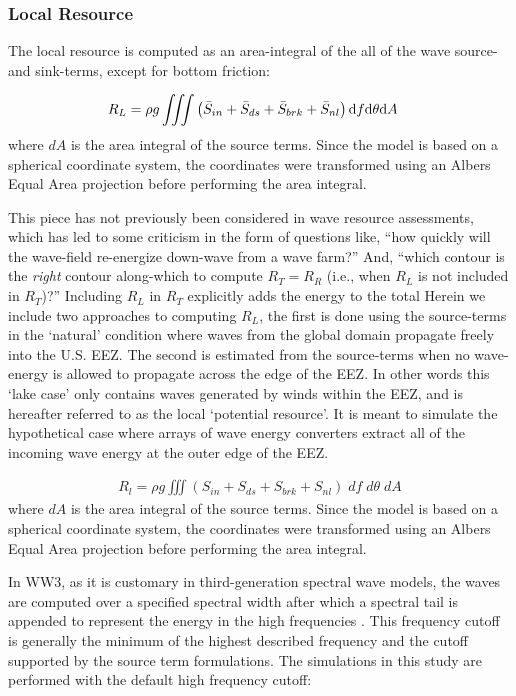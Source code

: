 \subsubsection{Local Resource} \label{sec:method:calc:local}

The local resource is computed as an area-integral of the all of the wave source- and sink-terms, except for bottom friction:

\begin{align}
  R_L &= \rho g \iiint \left ( \bar{S}_{in} + \bar{S}_{ds} + \bar{S}_{brk} + \bar{S}_{nl} \right ) \mathrm{d} f \mathrm{d} \theta \mathrm{d} A
\end{align}
where $dA$ is the area integral of the source terms. Since the model is based on a spherical coordinate system, the coordinates were transformed using an Albers Equal Area projection before performing the area integral. 

This piece has not previously been considered in wave resource assessments, which has led to some criticism in the form of questions like, ``how quickly will the wave-field re-energize down-wave from a wave farm?''  And, ``which contour is the {\em right} contour along-which to compute $R_T = R_R$ (i.e., when $R_L$ is not included in $R_T$)?'' Including $R_L$ in $R_T$ explicitly adds the energy to the total 
Herein we include two approaches to computing $R_L$, the first is done using the source-terms in the `natural' condition where waves from the global domain propagate freely into the U.S. EEZ. The second is estimated from the source-terms when no wave-energy is allowed to propagate across the edge of the EEZ. In other words this `lake case' only contains waves generated by winds within the EEZ, and is hereafter referred to as the local `potential resource'. It is meant to simulate the hypothetical case where arrays of wave energy converters extract all of the incoming wave energy at the outer edge of the EEZ.

\begin{align}
  R_{l} = \rho g \iiint \left(S_{in} + S_{ds} + S_{brk} + S_{nl} \right) \; df \; d\theta \; dA
\end{align}
where $dA$ is the area integral of the source terms. Since the model is based on a spherical coordinate system, the coordinates were transformed using an Albers Equal Area projection before performing the area integral. 

In WW3, as it is customary in third-generation spectral wave models, the waves are computed over a specified spectral width after which a spectral tail is appended to represent the energy in the high frequencies \citep[e.g.][]{ardhuinObservationSwellDissipation2009}. This frequency cutoff is generally the minimum of the highest described frequency and the cutoff supported by the source term formulations. The simulations in this study are performed with the default high frequency cutoff:

